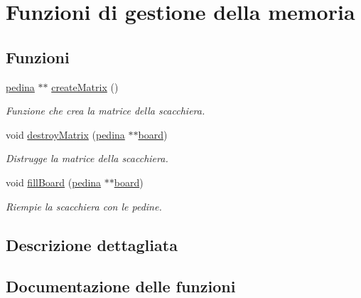 \hypertarget{group__Memoria}{}\section{Funzioni di gestione della memoria}
\label{group__Memoria}
\subsection*{Funzioni}
\begin{DoxyCompactItemize}
\item 
\hyperlink{ml__lib_8h_a71fee95122b31f5cb0b07d9c16ffa3a5}{pedina} $\ast$$\ast$ \hyperlink{group__Memoria_ga4a5eb161590279b5189a68bb27f0882e}{create\+Matrix} ()
\begin{DoxyCompactList}\small\item\em Funzione che crea la matrice della scacchiera. \end{DoxyCompactList}\item 
void \hyperlink{group__Memoria_ga898a4ffd57725b4666aa768ca71f1e1f}{destroy\+Matrix} (\hyperlink{ml__lib_8h_a71fee95122b31f5cb0b07d9c16ffa3a5}{pedina} $\ast$$\ast$\hyperlink{ml__main_8c_a62a3fe3d1df9ff58883b669f7f24e516}{board})
\begin{DoxyCompactList}\small\item\em Distrugge la matrice della scacchiera. \end{DoxyCompactList}\item 
void \hyperlink{group__Memoria_ga421a28d47106a4070c6eea92c1401821}{fill\+Board} (\hyperlink{ml__lib_8h_a71fee95122b31f5cb0b07d9c16ffa3a5}{pedina} $\ast$$\ast$\hyperlink{ml__main_8c_a62a3fe3d1df9ff58883b669f7f24e516}{board})
\begin{DoxyCompactList}\small\item\em Riempie la scacchiera con le pedine. \end{DoxyCompactList}\end{DoxyCompactItemize}


\subsection{Descrizione dettagliata}


\subsection{Documentazione delle funzioni}
\mbox{\label{group__Memoria_ga4a5eb161590279b5189a68bb27f0882e}} 
